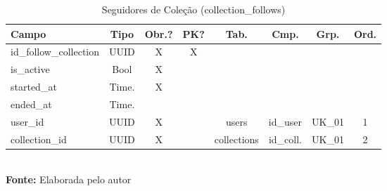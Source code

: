 \FloatBarrier
\begin{table}[!htbp]
\centering
\caption{Seguidores de Coleção (collection\_follows)}
\footnotesize
\begin{tabularx}{\textwidth}{ | X | c | c | c | c | c | c | c | }
    \hline
    \textbf{Campo} & \textbf{Tipo} & \textbf{Obr.?} & \textbf{PK?} & \textbf{Tab.} & \textbf{Cmp.} & \textbf{Grp.} & \textbf{Ord.}\\ \hline
    id\_follow\_collection & UUID & X & X &  &  &  &  \\ \hline
    is\_active & Bool & X &  &  &  &  &  \\ \hline
    started\_at & Time. & X &  &  &  &  &  \\ \hline
    ended\_at & Time. &  &  &  &  &  &  \\ \hline
    user\_id & UUID & X &  & users & id\_user & UK\_01 & 1 \\ \hline
    collection\_id & UUID & X &  & collections & id\_coll. & UK\_01 & 2 \\ \hline
\end{tabularx}
\vspace{0.1cm} \\ \textbf{Fonte:} Elaborada pelo autor
\label{tab:tabelaFollowCollectionDetalhado}
\end{table}

